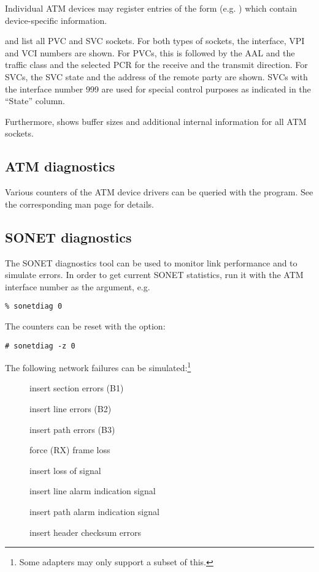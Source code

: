 Individual ATM devices may register entries of the form
 (e.g. ) which contain
device-specific information.

 and  list all PVC and SVC
sockets.
For both types of sockets, the interface, VPI and VCI numbers are shown. For
PVCs, this is followed by the AAL and the traffic class and the selected
PCR for the receive and the transmit direction. For SVCs, the SVC state
and the address of the remote party are shown. SVCs with the interface
number 999 are used for special control purposes as indicated in the ``State''
column.

Furthermore,  shows buffer sizes and additional
internal information for all ATM sockets.


\subsection{ATM diagnostics}

Various counters of the ATM device drivers can be queried with the
  program. See the corresponding man page for details.


\subsection{SONET diagnostics}

The SONET diagnostics tool can be used to monitor link performance
and to simulate errors. In order to get current SONET statistics,
run it with the ATM interface number as the argument, e.g.

\begin{verbatim}
% sonetdiag 0
\end{verbatim}

The counters can be reset with the  option:

\begin{verbatim}
# sonetdiag -z 0
\end{verbatim}

The following network failures can be simulated:\footnote{Some adapters
may only support a subset of this.}

\begin{description}
  \item[] insert section errors (B1)
  \item[] insert line errors (B2)
  \item[] insert path errors (B3)
  \item[] force (RX) frame loss
  \item[] insert loss of signal
  \item[] insert line alarm indication signal
  \item[] insert path alarm indication signal
  \item[] insert header checksum errors
\end{description}


